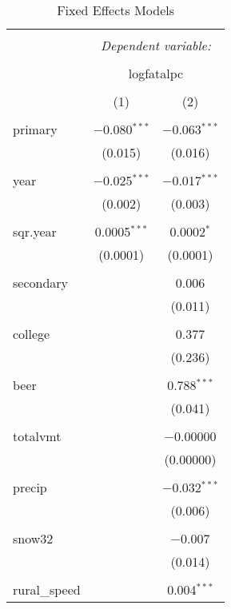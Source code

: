 \documentclass{article}
\begin{document}
\begin{table}[!htbp] \centering 
  \caption{Fixed Effects Models} 
  \label{} 
\footnotesize 
\begin{tabular}{@{\extracolsep{5pt}}lcc} 
\\[-1.8ex]\hline 
\hline \\[-1.8ex] 
 & \multicolumn{2}{c}{\textit{Dependent variable:}} \\ 
\cline{2-3} 
\\[-1.8ex] & \multicolumn{2}{c}{logfatalpc} \\ 
\\[-1.8ex] & (1) & (2)\\ 
\hline \\[-1.8ex] 
 primary & $-$0.080$^{***}$ & $-$0.063$^{***}$ \\ 
  & (0.015) & (0.016) \\ 
  & & \\ 
 year & $-$0.025$^{***}$ & $-$0.017$^{***}$ \\ 
  & (0.002) & (0.003) \\ 
  & & \\ 
 sqr.year & 0.0005$^{***}$ & 0.0002$^{*}$ \\ 
  & (0.0001) & (0.0001) \\ 
  & & \\ 
 secondary &  & 0.006 \\ 
  &  & (0.011) \\ 
  & & \\ 
 college &  & 0.377 \\ 
  &  & (0.236) \\ 
  & & \\ 
 beer &  & 0.788$^{***}$ \\ 
  &  & (0.041) \\ 
  & & \\ 
 totalvmt &  & $-$0.00000 \\ 
  &  & (0.00000) \\ 
  & & \\ 
 precip &  & $-$0.032$^{***}$ \\ 
  &  & (0.006) \\ 
  & & \\ 
 snow32 &  & $-$0.007 \\ 
  &  & (0.014) \\ 
  & & \\ 
 rural\_speed &  & 0.004$^{***}$ \\ 

\end{tabular}
\end{table}
\end{document}
